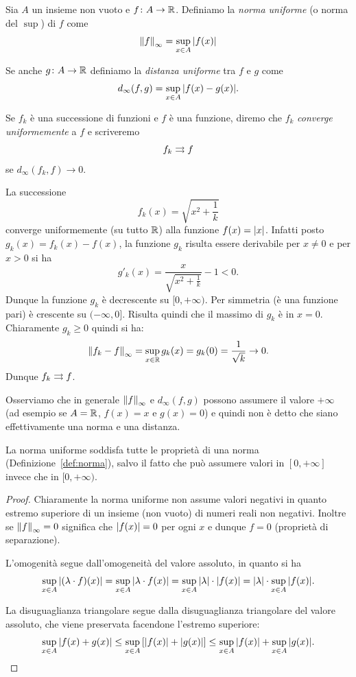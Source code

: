 \begin{definition}
\mymark{***}
Sia $A$ un insieme non vuoto e
$f\colon A \to {\mathbb R}$.
Definiamo la \emph{norma uniforme}%
 (o norma del $\sup$)
di $f$ come
\[
  {\left\Vert f\right\Vert}_\infty = \sup_{x\in A} {\left|f(x)\right|}
\]

Se anche $g\colon A \to {\mathbb R}$
definiamo la \emph{distanza uniforme}
tra $f$ e $g$ come
\[
  d_\infty(f,g) = \sup_{x\in A} {\left|f(x)-g(x)\right|}.
\]

Se $f_k$ è una successione di funzioni e $f$ è una funzione, diremo che $f_k$
\emph{converge uniformemente}
%
%
a $f$
e scriveremo
\[
f_k \rightrightarrows f
\] se
$d_\infty(f_k,f)\to 0$.
\end{definition}


\begin{example}
\label{ex:466533}
La successione
\[
f_k(x) = \sqrt{x^2 + \frac{1}{k}}
\]
converge uniformemente (su tutto ${\mathbb R}$) alla funzione $f(x) = {\left|x\right|}$. Infatti posto $g_k(x) = f_k(x) - f(x)$, 
la funzione $g_k$ risulta essere derivabile per $x\neq 0$ e per $x>0$ si ha
\[
  g'_k(x) = \frac{x}{\sqrt{x^2+\frac 1 k}} - 1 < 0.
\]
Dunque la funzione $g_k$ è decrescente su $[0,+\infty)$. Per simmetria (è una funzione pari) è crescente su $(-\infty, 0]$. 
Risulta quindi che il massimo di $g_k$ è in $x=0$. Chiaramente $g_k \ge 0$ quindi si ha:
\[
  {\left\Vert f_k - f\right\Vert}_\infty = \sup_{x\in {\mathbb R}} g_k(x) = g_k(0) = \frac{1}{\sqrt k} \to 0.
\]
Dunque $f_k \rightrightarrows f$.
\end{example}

Osserviamo che in generale ${\left\Vert f\right\Vert}_\infty$ e $d_\infty(f,g)$ possono assumere il valore $+\infty$ (ad esempio se $A={\mathbb R}$, $f(x)=x$ e $g(x)=0$)
e quindi non è detto che siano effettivamente
una norma e una distanza.

\begin{theorem}
La norma uniforme soddisfa tutte le proprietà di una norma
(Definizione~\ref{def:norma}), salvo il fatto che può assumere valori in $[0,+\infty]$ invece che in $[0,+\infty)$.
\end{theorem}
%
\begin{proof}
Chiaramente la norma uniforme non assume valori negativi in quanto estremo superiore di un insieme (non vuoto) di numeri reali non negativi. Inoltre se ${\left\Vert f\right\Vert}_\infty=0$ significa che ${\left|f(x)\right|}=0$ per ogni $x$ e dunque $f=0$ (proprietà di separazione).

L'omogenità segue dall'omogeneità del valore assoluto, in quanto si ha
\[
  \sup_{x\in A} {\left|(\lambda \cdot f)(x)\right|}
  = \sup_{x\in A}{\left|\lambda \cdot f(x)\right|}
  = \sup_{x\in A}{\left|\lambda\right|}\cdot {\left|f(x)\right|}
  = {\left|\lambda\right|} \cdot \sup_{x\in A}{\left|f(x)\right|}.
\]

La disuguaglianza triangolare segue dalla disuguaglianza triangolare del valore assoluto, che viene preservata facendone l'estremo superiore:
\[
  \sup_{x\in A} {\left|f(x)+g(x)\right|}
  \le \sup_{x\in A} {\left[ {\left|f(x)\right|} + {\left|g(x)\right|} \right]}
  \le \sup_{x\in A} {\left|f(x)\right|} + \sup_{x\in A} {\left|g(x)\right|}.
\]
\end{proof}

